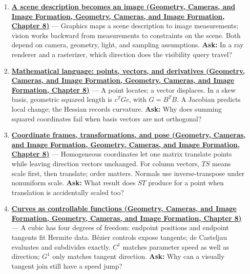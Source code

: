 \begin{enumerate}
\def\labelenumi{\arabic{enumi}.}
\item
  \textbf{\href{../03-Geometry-Cameras-and-Image-Formation/main.pdf\#nameddest=03-visual-computing-i-ch001-a-scene-description-becomes-an-image}{A scene description becomes an image (Geometry, Cameras, and Image Formation, Geometry, Cameras, and Image Formation, Chapter 8)}} --- Graphics maps a scene description to image measurements; vision works backward from measurements to constraints on the scene. Both depend on camera, geometry, light, and sampling assumptions. \textbf{Ask:} In a ray renderer and a rasterizer, which direction does the visibility query travel?
\item
  \textbf{\href{../03-Geometry-Cameras-and-Image-Formation/main.pdf\#nameddest=03-visual-computing-i-ch001-mathematical-language-points-vectors-and-derivatives}{Mathematical language: points, vectors, and derivatives (Geometry, Cameras, and Image Formation, Geometry, Cameras, and Image Formation, Chapter 8)}} --- A point locates; a vector displaces. In a skew basis, geometric squared length is \(c^T Gc\), with \(G=B^TB\). A Jacobian predicts local change; the Hessian records curvature. \textbf{Ask:} Why does summing squared coordinates fail when basis vectors are not orthogonal?
\item
  \textbf{\href{../03-Geometry-Cameras-and-Image-Formation/main.pdf\#nameddest=03-visual-computing-i-ch001-coordinate-frames-transformations-and-pose}{Coordinate frames, transformations, and pose (Geometry, Cameras, and Image Formation, Geometry, Cameras, and Image Formation, Chapter 8)}} --- Homogeneous coordinates let one matrix translate points while leaving direction vectors unchanged. For column vectors, \(TS\) means scale first, then translate; order matters. Normals use inverse-transpose under nonuniform scale. \textbf{Ask:} What result does \(ST\) produce for a point when translation is accidentally scaled too?
\item
  \textbf{\href{../03-Geometry-Cameras-and-Image-Formation/main.pdf\#nameddest=03-visual-computing-i-ch001-curves-as-controllable-functions}{Curves as controllable functions (Geometry, Cameras, and Image Formation, Geometry, Cameras, and Image Formation, Chapter 8)}} --- A cubic has four degrees of freedom: endpoint positions and endpoint tangents fit Hermite data. Bézier controls expose tangents; de Casteljau evaluates and subdivides exactly. \(C^1\) matches parameter speed as well as direction; \(G^1\) only matches tangent direction. \textbf{Ask:} Why can a visually tangent join still have a speed jump?

\end{enumerate}
